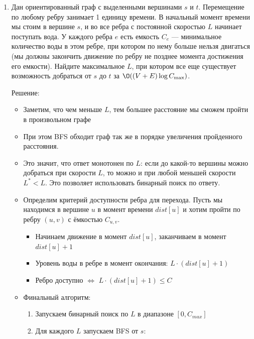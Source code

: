 \begin{enumerate}
\begin{itemize}
      \item Также заметим, что теоретически может существовать путь, который проходит только через бесплатные рёбра.
      Тогда можно запустить обычный BFS только на бесплатных рёбрах и получить ответ за $\O(|V| + |E|)$.
      Это оптимизация частного случая, которая может помочь при больших $K$.

    \end{itemize}

  \item
    Дан ориентированный граф с выделенными вершинами $s$ и $t$. Перемещение по любому ребру занимает 1 единицу времени.
    В начальный момент времени мы стоим в вершине $s$, и во все ребра с постоянной скоростью $L$ начинает поступать вода.
    У каждого ребра $e$ есть емкость $C_e$ --- минимальное количество воды в этом ребре, при котором по нему больше
    нельзя двигаться (мы должны закончить движение по ребру не позднее момента достижения его емкости). Найдите
    максимальное $L$, при котором все еще существует возможность добраться от $s$ до $t$ за $\O((V + E)\log{C_{\max}})$.

    Решение:

    \begin{itemize}
      \item Заметим, что чем меньше $L$, тем большее расстояние мы сможем пройти в произвольном графе
      \item При этом BFS обходит граф так же в порядке увеличения пройденного расстояния.
      \item Это значит, что ответ монотонен по $L$: если до какой-то вершины можно добраться при скорости $L$, то можно и при любой меньшей скорости $L^* < L$.
      Это позволяет использовать бинарный поиск по ответу.

      \item Определим критерий доступности ребра для перехода.
      Пусть мы находимся в вершине $u$ в момент времени $dist[u]$ и хотим пройти по ребру $(u, v)$ с ёмкостью $C_{u,v}$.
      \begin{itemize}
        \item Начинаем движение в момент $dist[u]$, заканчиваем в момент $dist[u] + 1$
        \item Уровень воды в ребре в момент окончания: $L \cdot (dist[u] + 1)$
        \item Ребро доступно $\Leftrightarrow$ $L \cdot (dist[u] + 1) \leq C$
      \end{itemize}

      \item Финальный алгоритм:
      \begin{enumerate}
        \item Запускаем бинарный поиск по $L$ в диапазоне $[0, C_{max}]$
        \item Для каждого $L$ запускаем BFS от $s$:


\end{enumerate}
\end{itemize}
\end{enumerate}
